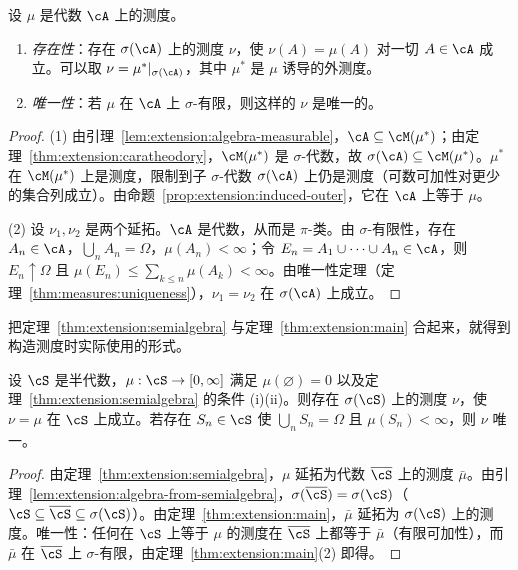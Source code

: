 \begin{theorem}\label{thm:extension:main}
设 $\mu$ 是代数 $\cA$ 上的测度。
\begin{enumerate}
\item \emph{存在性}：存在 $\sigma(\cA)$ 上的测度 $\nu$，使 $\nu(A)=\mu(A)$ 对一切 $A\in\cA$ 成立。可以取 $\nu=\mu^*|_{\sigma(\cA)}$，其中 $\mu^*$ 是 $\mu$ 诱导的外测度。
\item \emph{唯一性}：若 $\mu$ 在 $\cA$ 上 $\sigma$-有限，则这样的 $\nu$ 是唯一的。
\end{enumerate}
\end{theorem}
\begin{proof}
(1) 由引理~\ref{lem:extension:algebra-measurable}，$\cA\subseteq\cM(\mu^*)$；由定理~\ref{thm:extension:caratheodory}，$\cM(\mu^*)$ 是 $\sigma$-代数，故 $\sigma(\cA)\subseteq\cM(\mu^*)$。$\mu^*$ 在 $\cM(\mu^*)$ 上是测度，限制到子 $\sigma$-代数 $\sigma(\cA)$ 上仍是测度（可数可加性对更少的集合列成立）。由命题~\ref{prop:extension:induced-outer}，它在 $\cA$ 上等于 $\mu$。

(2) 设 $\nu_1,\nu_2$ 是两个延拓。$\cA$ 是代数，从而是 $\pi$-类。由 $\sigma$-有限性，存在 $A_n\in\cA$，$\bigcup_nA_n=\Omega$，$\mu(A_n)<\infty$；令 $E_n=A_1\cup\cdots\cup A_n\in\cA$，则 $E_n\uparrow\Omega$ 且 $\mu(E_n)\leqslant\sum_{k\leqslant n}\mu(A_k)<\infty$。由唯一性定理（定理~\ref{thm:measures:uniqueness}），$\nu_1=\nu_2$ 在 $\sigma(\cA)$ 上成立。
\end{proof}

把定理~\ref{thm:extension:semialgebra} 与定理~\ref{thm:extension:main} 合起来，就得到构造测度时实际使用的形式。

\begin{corollary}[从半代数延拓]\label{cor:extension:semialgebra}
设 $\cS$ 是半代数，$\mu:\cS\to[0,\infty]$ 满足 $\mu(\varnothing)=0$ 以及定理~\ref{thm:extension:semialgebra} 的条件 (i)(ii)。则存在 $\sigma(\cS)$ 上的测度 $\nu$，使 $\nu=\mu$ 在 $\cS$ 上成立。若存在 $S_n\in\cS$ 使 $\bigcup_nS_n=\Omega$ 且 $\mu(S_n)<\infty$，则 $\nu$ 唯一。
\end{corollary}
\begin{proof}
由定理~\ref{thm:extension:semialgebra}，$\mu$ 延拓为代数 $\overline\cS$ 上的测度 $\bar\mu$。由引理~\ref{lem:extension:algebra-from-semialgebra}，$\sigma(\overline\cS)=\sigma(\cS)$（$\cS\subseteq\overline\cS\subseteq\sigma(\cS)$）。由定理~\ref{thm:extension:main}，$\bar\mu$ 延拓为 $\sigma(\cS)$ 上的测度。唯一性：任何在 $\cS$ 上等于 $\mu$ 的测度在 $\overline\cS$ 上都等于 $\bar\mu$（有限可加性），而 $\bar\mu$ 在 $\overline\cS$ 上 $\sigma$-有限，由定理~\ref{thm:extension:main}(2) 即得。
\end{proof}

